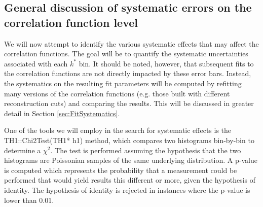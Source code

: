 


\subsection{General discussion of systematic errors on the correlation function level}
\label{sec:GeneralCfSysErrorDiscussion}

We will now attempt to identify the various systematic effects that may affect the correlation functions.  The goal will be to quantify the systematic uncertainties associated with each $k^*$ bin.      It should be noted, however, that subsequent fits to the correlation functions are not directly impacted by these error bars.  Instead, the systematics on the resulting fit parameters will be computed by refitting many versions of the correlation functions (e.g. those built with different reconstruction cuts) and comparing the results. This will be discussed in greater detail in Section \ref{sec:FitSystematics}.

One of the tools we will employ in the search for systematic effects is the TH1::Chi2Test(TH1* h1) method, which compares two histograms bin-by-bin to determine a $\chi^2$.  The test is performed assuming the hypothesis that the two histograms are Poissonian samples of the same underlying distribution.  A p-value is computed which represents the probability that a measurement could be performed that would yield results this different or more, given the hypothesis of identity.  The hypothesis of identity is rejected in instances where the p-value is lower than 0.01.

